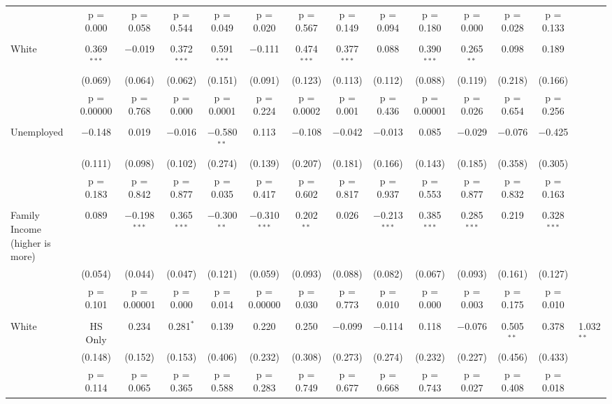 \begin{longtable}{@{\extracolsep{5pt}}lcccccccccccc}
  & p = 0.000 & p = 0.058 & p = 0.544 & p = 0.049 & p = 0.020 & p = 0.567 & p = 0.149 & p = 0.094 & p = 0.180 & p = 0.000 & p = 0.028 & p = 0.133 \\ 
  & & & & & & & & & & & & \\ 
 White & 0.369$^{***}$ & $-$0.019 & 0.372$^{***}$ & 0.591$^{***}$ & $-$0.111 & 0.474$^{***}$ & 0.377$^{***}$ & 0.088 & 0.390$^{***}$ & 0.265$^{**}$ & 0.098 & 0.189 \\ 
  & (0.069) & (0.064) & (0.062) & (0.151) & (0.091) & (0.123) & (0.113) & (0.112) & (0.088) & (0.119) & (0.218) & (0.166) \\ 
  & p = 0.00000 & p = 0.768 & p = 0.000 & p = 0.0001 & p = 0.224 & p = 0.0002 & p = 0.001 & p = 0.436 & p = 0.00001 & p = 0.026 & p = 0.654 & p = 0.256 \\ 
  & & & & & & & & & & & & \\ 
 Unemployed & $-$0.148 & 0.019 & $-$0.016 & $-$0.580$^{**}$ & 0.113 & $-$0.108 & $-$0.042 & $-$0.013 & 0.085 & $-$0.029 & $-$0.076 & $-$0.425 \\ 
  & (0.111) & (0.098) & (0.102) & (0.274) & (0.139) & (0.207) & (0.181) & (0.166) & (0.143) & (0.185) & (0.358) & (0.305) \\ 
  & p = 0.183 & p = 0.842 & p = 0.877 & p = 0.035 & p = 0.417 & p = 0.602 & p = 0.817 & p = 0.937 & p = 0.553 & p = 0.877 & p = 0.832 & p = 0.163 \\ 
  & & & & & & & & & & & & \\ 
 Family Income (higher is more) & 0.089 & $-$0.198$^{***}$ & 0.365$^{***}$ & $-$0.300$^{**}$ & $-$0.310$^{***}$ & 0.202$^{**}$ & 0.026 & $-$0.213$^{***}$ & 0.385$^{***}$ & 0.285$^{***}$ & 0.219 & 0.328$^{***}$ \\ 
  & (0.054) & (0.044) & (0.047) & (0.121) & (0.059) & (0.093) & (0.088) & (0.082) & (0.067) & (0.093) & (0.161) & (0.127) \\ 
  & p = 0.101 & p = 0.00001 & p = 0.000 & p = 0.014 & p = 0.00000 & p = 0.030 & p = 0.773 & p = 0.010 & p = 0.000 & p = 0.003 & p = 0.175 & p = 0.010 \\ 
  & & & & & & & & & & & & \\ 
 White & HS Only & 0.234 & 0.281$^{*}$ & 0.139 & 0.220 & 0.250 & $-$0.099 & $-$0.114 & 0.118 & $-$0.076 & 0.505$^{**}$ & 0.378 & 1.032$^{**}$ \\ 
  & (0.148) & (0.152) & (0.153) & (0.406) & (0.232) & (0.308) & (0.273) & (0.274) & (0.232) & (0.227) & (0.456) & (0.433) \\ 
  & p = 0.114 & p = 0.065 & p = 0.365 & p = 0.588 & p = 0.283 & p = 0.749 & p = 0.677 & p = 0.668 & p = 0.743 & p = 0.027 & p = 0.408 & p = 0.018 \\ 

\end{longtable}
